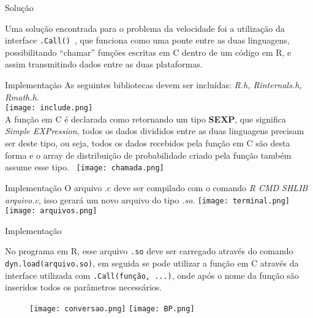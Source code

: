\documentclass{beamer}
\begin{document}
\begin{frame}{Solução}
    
Uma solução encontrada para o problema da velocidade foi a utilização da interface \texttt{.Call()}~\cite{Speed}, que funciona como uma ponte entre as duas linguagens, possibilitando “chamar” funções escritas em C dentro de um código em R, e assim transmitindo dados entre as duas plataformas.
    
\end{frame}

\begin{frame}{Implementação}
 As seguintes bibliotecas devem ser incluídas: \textit{R.h, Rinternals.h, Rmath.h}. \\
 \vspace{0.3cm}
 \texttt{[image: include.png]}\\
 
 A função em C é declarada como retornando um tipo \textbf{SEXP}, que significa \textit{Simple EXPression}, todos os dados divididos entre as duas linguagens precisam ser deste tipo, ou seja, todos os dados recebidos pela função em C são desta forma e o array de distribuição de probabilidade criado pela função também assume esse tipo.~\cite{.Call,Extensions}
 \vspace{0.3cm}
 \texttt{[image: chamada.png]}\\
     
\end{frame}

\begin{frame}{Implementação}
O arquivo .c deve ser compilado com o comando \textit{R CMD SHLIB arquivo.c}, isso gerará um novo arquivo do tipo \textit{.so}.
\vspace{0.3cm}    
\texttt{[image: terminal.png]}\\
\vspace{0.3cm}
\texttt{[image: arquivos.png]}\\
\vspace{0.3cm}
\end{frame}

\begin{frame}{Implementação}

 No programa em R, esse arquivo \texttt{.so} deve ser carregado através do comando \texttt{dyn.load(arquivo.so)}, em seguida se pode utilizar a função em C através da interface utilizada com \texttt{.Call(função, ...)}, onde após o nome da função são inseridos todos os parâmetros necessários.\\

\begin{figure}[h]
\texttt{[image: conversao.png]}
\texttt{[image: BP.png]}
\end{figure}
\end{frame}
\end{document}
